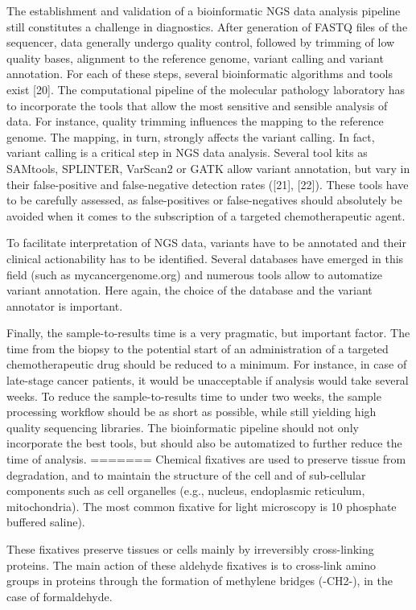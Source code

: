 The establishment and validation of a bioinformatic NGS data analysis pipeline
still constitutes a challenge in diagnostics. After generation of FASTQ files of
the sequencer, data generally undergo quality control, followed by trimming of
low quality bases, alignment to the reference genome, variant calling and
variant annotation. For each of these steps, several bioinformatic algorithms
and tools exist [20]. The computational pipeline of the molecular pathology
laboratory has to incorporate the tools that allow the most sensitive and
sensible analysis of data. For instance, quality trimming influences the mapping
to the reference genome. The mapping, in turn, strongly affects the variant
calling. In fact, variant calling is a critical step in NGS data analysis.
Several tool kits as SAMtools, SPLINTER, VarScan2 or GATK allow variant
annotation, but vary in their false-positive and false-negative detection rates
([21], [22]). These tools have to be carefully assessed, as false-positives or
false-negatives should absolutely be avoided when it comes to the subscription
of a targeted chemotherapeutic agent.

To facilitate interpretation of NGS data, variants have to be annotated and their clinical actionability has to be identified. Several databases have emerged in this field (such as mycancergenome.org) and numerous tools allow to automatize variant annotation. Here again, the choice of the database and the variant annotator is important.

Finally, the sample-to-results time is a very pragmatic, but important factor. The time from the biopsy to the potential start of an administration of a targeted chemotherapeutic drug should be reduced to a minimum. For instance, in case of late-stage cancer patients, it would be unacceptable if analysis would take several weeks. To reduce the sample-to-results time to under two weeks, the sample processing workflow should be as short as possible, while still yielding high quality sequencing libraries. The bioinformatic pipeline should not only incorporate the best tools, but should also be automatized to further reduce the time of analysis.
=======
Chemical fixatives are used to preserve tissue from degradation, and to maintain
the structure of the cell and of sub-cellular components such as cell organelles
(e.g., nucleus, endoplasmic reticulum, mitochondria). The most common fixative
for light microscopy is 10%
phosphate buffered saline).

These fixatives preserve tissues or cells mainly by irreversibly cross-linking
proteins. The main action of these aldehyde fixatives is to cross-link amino
groups in proteins through the formation of methylene bridges (-CH2-), in the
case of formaldehyde.

